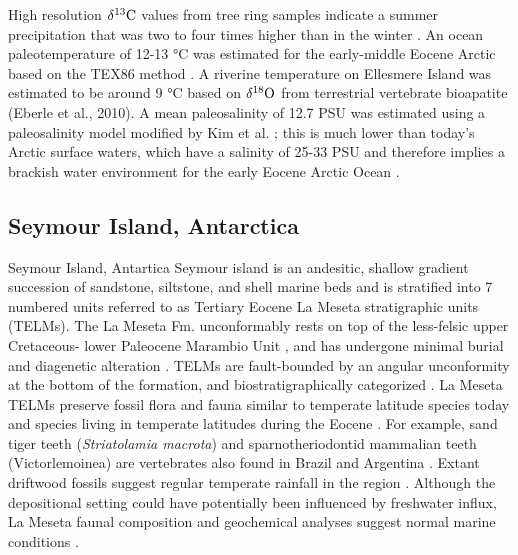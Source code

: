 \documentclass[]{rsos}%
\begin{document}
High resolution $\delta^{13}{\rm C}$ values from tree ring samples indicate a summer precipitation that was two to four times higher than in the winter \cite{schubert2012summertime}.
An ocean paleotemperature of 12-13 °C was estimated for the early-middle Eocene Arctic based on the TEX86 method \cite{sluijs2008arctic}. 
A riverine temperature on Ellesmere Island was estimated to be around 9 °C based on $\delta^{18}{\rm O}$ from terrestrial vertebrate bioapatite (Eberle et al., 2010). 
A mean paleosalinity of 12.7 PSU was estimated using a paleosalinity model modified by Kim et al. \cite{Kim2014d}; this is much lower than today's Arctic surface waters, which have a salinity of 25-33 PSU and therefore implies a brackish water environment for the early Eocene Arctic Ocean \cite{Waddell2008, Kim2014d}.

\subsection{Seymour Island, Antarctica}
Seymour Island, Antartica
Seymour island is an andesitic, shallow gradient succession of sandstone, siltstone, and shell marine beds and is stratified into 7 numbered units referred to as Tertiary Eocene La Meseta stratigraphic units (TELMs).
The La Meseta Fm. unconformably rests on top of the less-felsic upper Cretaceous- lower Paleocene Marambio Unit \cite{Sadler1988, Marenssi1994, ivany2004intra}, and has undergone minimal burial and diagenetic alteration \cite{marenssi2002provenance}.  
TELMs are fault-bounded by an angular unconformity at the bottom of the formation, and biostratigraphically categorized \cite{Sadler1988, Long1992, Reguero2012}. 
La Meseta TELMs preserve fossil flora and fauna similar to temperate latitude species today and species living in temperate latitudes during the Eocene \cite{Marenssi1994, Reguero2012}. 
For example, sand tiger  teeth (\emph{Striatolamia macrota}) and sparnotheriodontid mammalian teeth (Victorlemoinea) are vertebrates also found in Brazil and Argentina \cite{Marenssi1994}.
Extant driftwood fossils suggest regular temperate rainfall in the region \cite{case1994fossil, Ivany2008}. 
Although the depositional setting could have potentially been influenced by freshwater influx, La Meseta faunal composition and geochemical analyses suggest normal marine conditions \cite{Stilwell1992, marenssi2002provenance, Ivany2008}.
\end{document}

